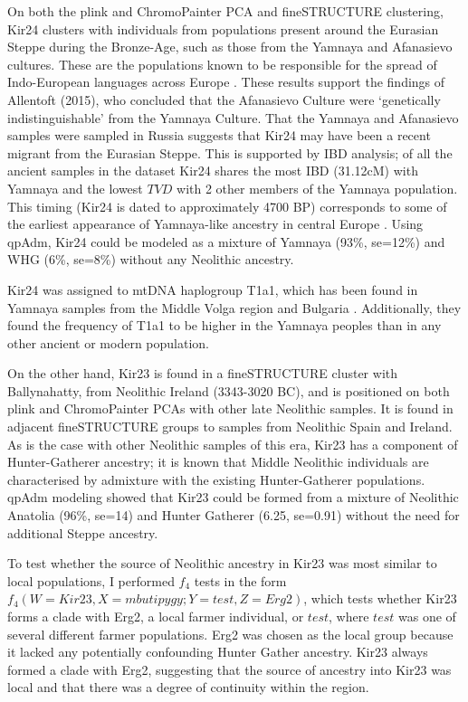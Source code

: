 On both the plink and ChromoPainter PCA and fineSTRUCTURE clustering, Kir24 clusters with individuals from populations present around the Eurasian Steppe during the Bronze-Age, such as those from the Yamnaya and Afanasievo cultures. These are the populations known to be responsible for the spread of Indo-European languages across Europe \cite{Haak2015}. These results support the findings of Allentoft (2015), who concluded that the Afanasievo Culture were `genetically indistinguishable' from the Yamnaya Culture. That the Yamnaya and Afanasievo samples were sampled in Russia suggests that Kir24 may have been a recent migrant from the Eurasian Steppe. This is supported by IBD analysis; of all the ancient samples in the dataset Kir24 shares the most IBD (31.12cM) with Yamnaya and the lowest $TVD$ with 2 other members of the Yamnaya population. This timing (Kir24 is dated to approximately 4700 BP) corresponds to some of the earliest appearance of Yamnaya-like ancestry in central Europe \cite{Racimo8989}. Using qpAdm, Kir24 could be modeled as a mixture of Yamnaya (93\%, se=12\%) and WHG (6\%, se=8\%) without any Neolithic ancestry. 

Kir24 was assigned to mtDNA haplogroup T1a1, which has been found in Yamnaya samples from the Middle Volga region and Bulgaria \cite{keyser2009ancient}. Additionally, they found the frequency of T1a1 to be higher in the Yamnaya peoples than in any other ancient or modern population. 

On the other hand, Kir23 is found in a fineSTRUCTURE cluster with Ballynahatty, from Neolithic Ireland (3343-3020 BC), and is positioned on both plink and ChromoPainter PCAs with other late Neolithic samples. It is found in adjacent fineSTRUCTURE groups to samples from Neolithic Spain and Ireland. As is the case with other Neolithic samples of this era, Kir23 has a component of Hunter-Gatherer ancestry; it is known that Middle Neolithic individuals are characterised by admixture with the existing Hunter-Gatherer populations. qpAdm modeling showed that Kir23 could be formed from a mixture of Neolithic Anatolia (96\%, se=14)  and Hunter Gatherer (6.25, se=0.91) without the need for additional Steppe ancestry. 

To test whether the source of Neolithic ancestry in Kir23 was most similar to local populations, I performed $f_{4}$ tests in the form $f_{4}(W=Kir23, X=mbutipygy; Y=test, Z=Erg2)$, which tests whether Kir23 forms a clade with Erg2, a local farmer individual, or $test$, where $test$ was one of several different farmer populations. Erg2 was chosen as the local group because it lacked any potentially confounding Hunter Gather ancestry. Kir23 always formed a clade with Erg2, suggesting that the source of ancestry into Kir23 was local and that there was a degree of continuity within the region. 

